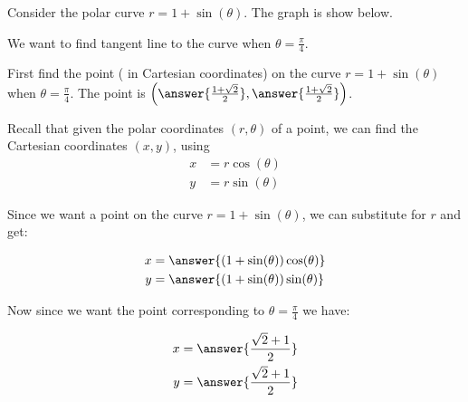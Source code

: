 \documentclass{ximera}
\author{Jason Miller}
\begin{document}
\begin{exercise}


Consider the polar curve $r=1+\sin(\theta)$. The graph is show below. 




\begin{image}  
\end{image} 

We want to find tangent line to the curve when $\theta=\frac{\pi}{4}$. 

First find the point ( in Cartesian coordinates) on the curve $r=1+\sin(\theta)$ when $\theta=\frac{\pi}{4}$. 
The point is $\left( \answer{ \frac{1+\sqrt{2}}{2}},  \answer{ \frac{1+\sqrt{2}}{2}} \right)$. 

\begin{hint}

Recall that given the polar coordinates $(r,\theta)$ of a point, we can find the Cartesian coordinates $(x, y)$, using
\begin{align*}
x&=r\cos(\theta) \\
y&=r\sin(\theta)
\end{align*}

Since we want a point on the curve $r=1+\sin(\theta)$, we can substitute for $r$ and get:

\begin{align*}
x&=\answer{(1+\sin(\theta))\cos(\theta)} \\
y&=\answer{(1+\sin(\theta))\sin(\theta) }
\end{align*}

Now since we want the point corresponding to $\theta=\frac{\pi}{4}$ we have:


\begin{align*}
x&=\answer{ \frac{\sqrt{2}+1}{2} } \\
y&=\answer{\frac{\sqrt{2}+1}{2}  }
\end{align*}


\end{hint}
\end{exercise}
\end{document}
